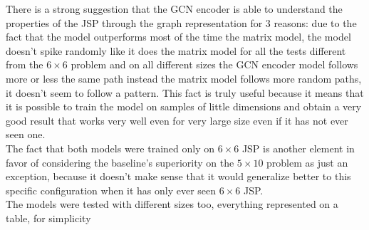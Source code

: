 \documentclass[12pt]{book}
\begin{document}
There is a strong suggestion that the GCN encoder is able to understand the properties of the JSP through the graph representation for 3 reasons: due to the fact that the model outperforms most of the time the matrix model, the model doesn't spike randomly like it does the matrix model for all the tests different from the $6\times6$ problem and on all different sizes the GCN encoder model follows more or less the same path instead the matrix model follows more random paths, it doesn't seem to follow a pattern.
This fact is truly useful because it means that it is possible to train the model on samples of little dimensions and obtain a very good result that works very well even for very large size even if it has not ever seen one.\\
The fact that both models were trained only on $6\times6$ JSP is 
another element in favor of considering the baseline's superiority 
on the $5\times10$ problem as just an exception, because it doesn't make 
sense that it would generalize better to this specific configuration 
when it has only ever seen $6\times6$ JSP.\\
The models were tested with different sizes too, everything represented on a table, for simplicity
\end{document}
